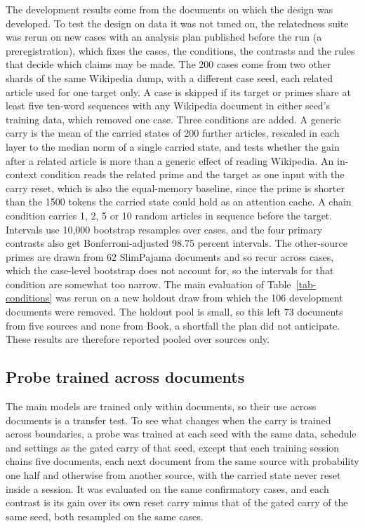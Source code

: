 \documentclass[12pt,a4paper]{report}
\begin{document}
The development results come from the documents on which the design was developed. To test the design on data it was not tuned on, the relatedness suite was rerun on new cases with an analysis plan published before the run (a preregistration), which fixes the cases, the conditions, the contrasts and the rules that decide which claims may be made. The 200 cases come from two other shards of the same Wikipedia dump, with a different case seed, each related article used for one target only. A case is skipped if its target or primes share at least five ten-word sequences with any Wikipedia document in either seed's training data, which removed one case. Three conditions are added. A generic carry is the mean of the carried states of 200 further articles, rescaled in each layer to the median norm of a single carried state, and tests whether the gain after a related article is more than a generic effect of reading Wikipedia. An in-context condition reads the related prime and the target as one input with the carry reset, which is also the equal-memory baseline, since the prime is shorter than the 1500 tokens the carried state could hold as an attention cache. A chain condition carries 1, 2, 5 or 10 random articles in sequence before the target. Intervals use 10{,}000 bootstrap resamples over cases, and the four primary contrasts also get Bonferroni-adjusted 98.75 percent intervals. The other-source primes are drawn from 62 SlimPajama documents and so recur across cases, which the case-level bootstrap does not account for, so the intervals for that condition are somewhat too narrow. The main evaluation of Table~\ref{tab-conditions} was rerun on a new holdout draw from which the 106 development documents were removed. The holdout pool is small, so this left 73 documents from five sources and none from Book, a shortfall the plan did not anticipate. These results are therefore reported pooled over sources only.

\subsection{Probe trained across documents}
\label{sec-mixed-method}

The main models are trained only within documents, so their use across documents is a transfer test. To see what changes when the carry is trained across boundaries, a probe was trained at each seed with the same data, schedule and settings as the gated carry of that seed, except that each training session chains five documents, each next document from the same source with probability one half and otherwise from another source, with the carried state never reset inside a session. It was evaluated on the same confirmatory cases, and each contrast is its gain over its own reset carry minus that of the gated carry of the same seed, both resampled on the same cases.
\end{document}
